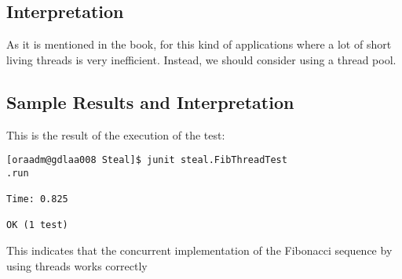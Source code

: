 \subsection{Interpretation}
\par
As it is mentioned in the book, for this kind of applications where a lot of
short living threads is very inefficient. Instead, we should consider using a
thread pool.
\par
\subsection{Sample Results and Interpretation}
\par
This is the result of the execution of the test:
\par
\hfill
\begin{verbatim}
[oraadm@gdlaa008 Steal]$ junit steal.FibThreadTest
.run

Time: 0.825

OK (1 test)
\end{verbatim}
\hfill
\par
This indicates that the concurrent implementation of the Fibonacci sequence by
using threads works correctly

